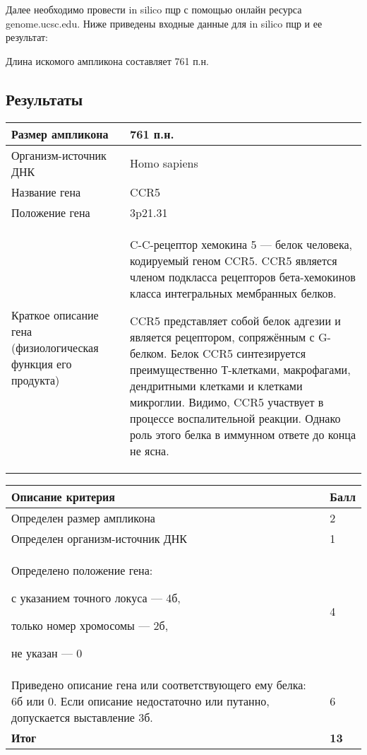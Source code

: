 
Далее необходимо провести in silico пцр с помощью онлайн ресурса genome.ucsc.edu. Ниже приведены входные данные для  in silico пцр и  ее результат:


Длина искомого ампликона составляет 761 п.н.


\subsection*{Результаты}

\begin{tabular}{|p{6cm}|p{8cm}|}
    \hline
    Размер ампликона & 761 п.н. \\
    \hline
    Организм-источник ДНК & Homo sapiens \\
    \hline
    Название гена & CCR5 \\
    \hline
    Положение гена & 3p21.31 \\
    \hline
    Краткое описание гена (физиологическая функция его продукта) & C-C-рецептор хемокина 5 — белок человека, кодируемый геном CCR5. CCR5 является членом подкласса рецепторов бета-хемокинов класса интегральных мембранных белков.
    
    CCR5 представляет собой белок адгезии и является рецептором, сопряжённым с G-белком. Белок CCR5 синтезируется преимущественно Т-клетками, макрофагами, дендритными клетками и клетками микроглии. Видимо, CCR5 участвует в процессе воспалительной реакции. Однако роль этого белка в иммунном ответе до конца не ясна.\\
    \hline
\end{tabular}

\markSection

\begin{tabular}{|p{11cm}|p{3cm}|}
    \hline
    \textbf{Описание критерия} & \textbf{Балл} \\
    \hline
    Определен размер ампликона & 2 \\
    \hline
    Определен организм-источник ДНК & 1 \\
    \hline
    Определено положение гена: 
    
    с указанием точного локуса — 4б, 
    
    только номер хромосомы — 2б, 
    
    не указан — 0 & 4 \\
    \hline
    Приведено описание гена или соответствующего ему белка: 6б или 0. Если описание недостаточно или путанно, допускается выставление 3б. & 6 \\
    \hline
    \hline
    \textbf{Итог} & \textbf{13} \\
    \hline    
\end{tabular}

